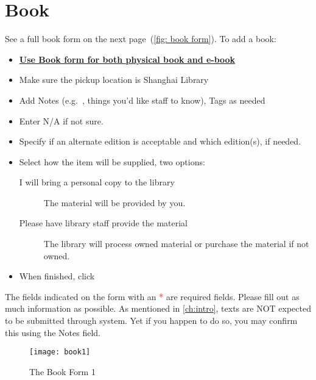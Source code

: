 \section{Book}
\label{sec:book}
See a full book form on the next page~(\autoref{fig: book form}). To add a book:
\begin{itemize}
    \item {\bfseries\uline{Use Book form for both physical book and e-book}}
    \item Make sure the pickup location is Shanghai Library
    \item Add Notes (e.g.\ , things you'd like staff to know), Tags as needed 
    \item Enter N/A if not sure.
    \item Specify if an alternate edition is acceptable and which edition(s), if needed. 
    \item Select how the item will be supplied, two options:
    \begin{description}
        \item[I will bring a personal copy to the library] The material will be provided by you.
        \item[Please have library staff provide the material] The library will process owned material or purchase the material if not owned.
    \end{description}
    \item When finished, click 
\end{itemize}

\vspace*{3ex}
\begin{table}[h]
    \centering
    \begin{notebox}
    The fields indicated on the form with an \textcolor{red}{*} are required fields. Please fill out as much information as possible. 
    \tcblower
    As mentioned in \autoref{ch:intro}, {\imp texts are NOT} expected to be submitted through \ares system. Yet if you happen to do so, you may confirm this using the Notes field.
    \end{notebox}
    \label{note: texts not expected}
\end{table}

\vspace*{5ex}
\begin{figure}[h]
    \centering
    \texttt{[image: book1]}
    \caption{The Book Form 1}
    \label{fig:bookformone}
\end{figure}


